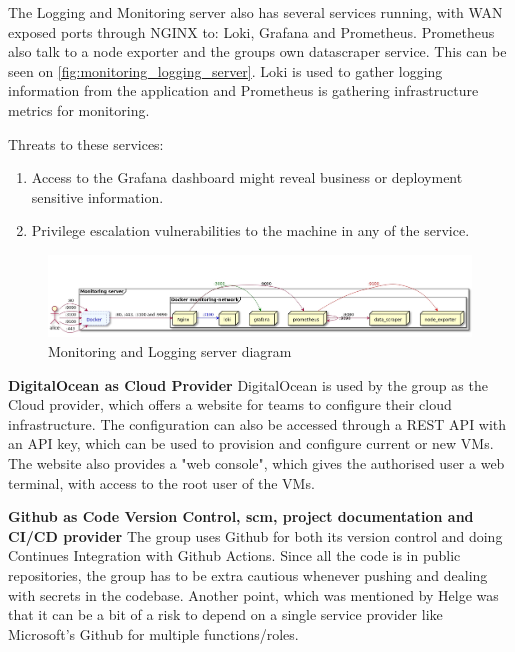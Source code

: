 The Logging and Monitoring server also has several services running, with WAN exposed ports through NGINX to: Loki, Grafana and Prometheus. Prometheus also talk to a node exporter and the groups own datascraper service. This can be seen on \autoref{fig:monitoring_logging_server}.
Loki is used to gather logging information from the application and Prometheus is gathering  infrastructure metrics for monitoring. 

Threats to these services:

\begin{enumerate}
    \item Access to the Grafana dashboard might reveal business or deployment sensitive information.
    \item Privilege escalation vulnerabilities to the machine in any of the service.
\end{enumerate}


\begin{figure}[H]
    \centering
    \includegraphics[scale=0.3]{images/logging/monitoring_logging.jpg}
    \caption{Monitoring and Logging server diagram}
    \label{fig:monitoring_logging_server}
\end{figure}

\textbf{DigitalOcean as Cloud Provider}
DigitalOcean is used by the group as the Cloud provider, which offers a website for teams to configure their cloud infrastructure. The configuration can also be accessed through a REST API with an API key, which can be used to provision and configure current or new VMs. The website also provides a "web console", which gives the authorised user a web terminal, with access to the root user of the VMs. 

\textbf{Github as Code Version Control, \acrshort{scm}, project documentation and CI/CD provider}
The group uses Github for both its version control and doing Continues Integration with Github Actions. Since all the code is in public repositories, the group has to be extra cautious whenever pushing and dealing with secrets in the codebase. Another point, which was mentioned by Helge was that it can be a bit of a risk to depend on a single service provider like Microsoft's Github for multiple functions/roles. 

